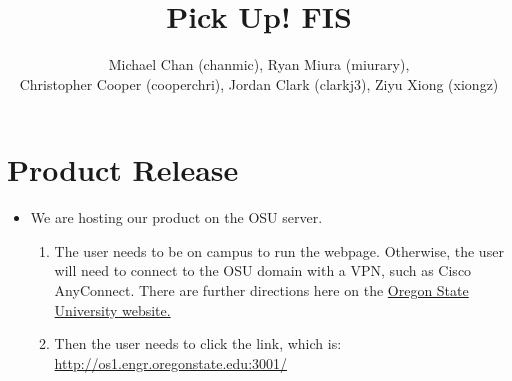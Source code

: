 \documentclass[a4paper]{article}
\title{Pick Up! FIS}
\author{Michael Chan (chanmic), Ryan Miura (miurary), \\Christopher Cooper (cooperchri), Jordan Clark (clarkj3), Ziyu Xiong (xiongz)}
\begin{document}
\maketitle

\section{Product Release}
\begin{itemize}
\item We are hosting our product on the OSU server. 
\begin{enumerate}
\item The user needs to be on campus to run the webpage. Otherwise, the user will need to connect to the OSU domain with a VPN, such as Cisco AnyConnect. There are further directions here on the \href{http://oregonstate.edu/helpdocs/network-and-phone/virtual-private-network-vpn/}{Oregon State University website.}
\item Then the user needs to click the link, which is: 
\url{http://os1.engr.oregonstate.edu:3001/}
\end{enumerate}
\end{itemize}
\end{document}
